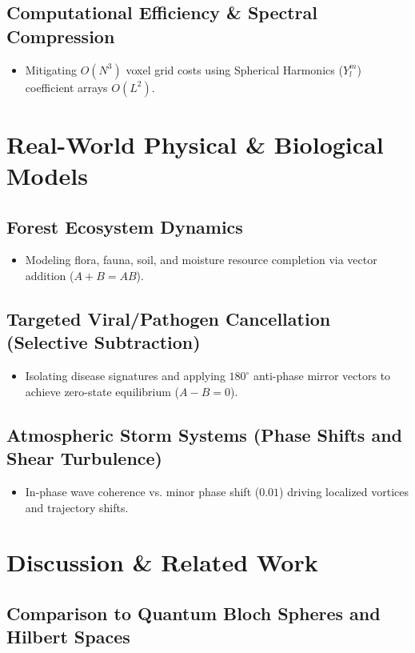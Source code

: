 \documentclass[12pt, a4paper]{article}
\begin{document}
\subsection{Computational Efficiency \& Spectral Compression}
\begin{itemize}
    \item Mitigating $O(N^3)$ voxel grid costs using Spherical Harmonics ($Y_l^m$) coefficient arrays $O(L^2)$.
\end{itemize}

\section{Real-World Physical \& Biological Models}
\subsection{Forest Ecosystem Dynamics}
\begin{itemize}
    \item Modeling flora, fauna, soil, and moisture resource completion via vector addition ($A + B = AB$).
\end{itemize}

\subsection{Targeted Viral/Pathogen Cancellation (Selective Subtraction)}
\begin{itemize}
    \item Isolating disease signatures and applying $180^\circ$ anti-phase mirror vectors to achieve zero-state equilibrium ($A - B = 0$).
\end{itemize}

\subsection{Atmospheric Storm Systems (Phase Shifts and Shear Turbulence)}
\begin{itemize}
    \item In-phase wave coherence vs. minor phase shift ($0.01$) driving localized vortices and trajectory shifts.
\end{itemize}

\section{Discussion \& Related Work}
\subsection{Comparison to Quantum Bloch Spheres and Hilbert Spaces}
\end{document}
